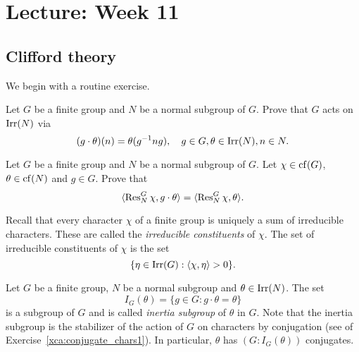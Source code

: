 \section{Lecture: Week 11}

\subsection{Clifford theory}

We begin with a routine exercise. 


\begin{exercise}
\label{xca:conjugate_chars1}
Let $G$ be a finite group and $N$ be a normal subgroup
of $G$. Prove that $G$ acts on $\operatorname{Irr}(N)$ via 
\[
(g\cdot\theta)(n)=\theta(g^{-1}ng),\quad 
g\in G,\theta\in\operatorname{Irr}(N),n\in N.
\]
\end{exercise}

\begin{exercise}
\label{xca:conjugate_chars2}
Let $G$ be a finite group and $N$ be a normal subgroup of $G$. 
Let $\chi\in\operatorname{cf}(G)$, $\theta\in\operatorname{cf}(N)$ and $g\in G$. Prove that
\[
\langle\operatorname{Res}_N^G\chi,g\cdot\theta\rangle=\langle\operatorname{Res}_N^G\chi,\theta\rangle.
\]
\end{exercise}

Recall that every character $\chi$ of a finite group is uniquely 
a sum of irreducible characters. These are called
the \emph{irreducible constituents} of $\chi$. The set 
of irreducible constituents of $\chi$ is the set  
\[
\{\eta\in\operatorname{Irr}(G):\langle\chi,\eta\rangle>0\}.
\]

Let $G$ be a finite group, $N$ be a normal subgroup 
and $\theta\in\operatorname{Irr}(N)$. The set 
\[
I_G(\theta)=\{g\in G:g\cdot\theta=\theta\}
\]
is a subgroup of $G$ and is called \emph{inertia subgroup} of $\theta$ in $G$. Note that the inertia
subgroup is the stabilizer of the action of $G$ 
on characters by conjugation (see 
of Exercise~\ref{xca:conjugate_chars1}). In particular, 
$\theta$ has 
$(G:I_G(\theta))$ conjugates. 

